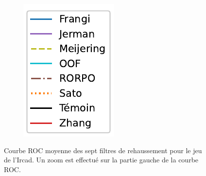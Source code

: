\begin{figure}[!ht]
\begin{subfigure}[t]{0.2\textwidth}
      \includegraphics[width=\textwidth,clip = true]{Images/standAloneLegend.pdf}
  \end{subfigure}
  \caption{Courbe ROC moyenne des sept filtres de rehaussement pour le jeu de l'Ircad. Un zoom est effectué sur la partie gauche de la courbe ROC.}
  \label{fig:Ircad_ROC}
\end{figure}


